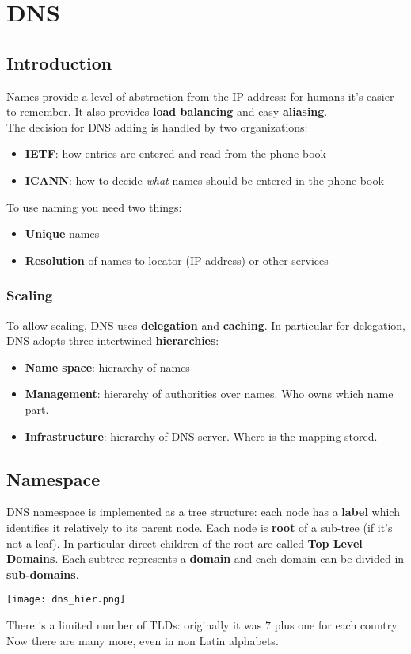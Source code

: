 \newpage
\section{DNS}
\subsection{Introduction}
Names provide a level of abstraction from the IP address: for humans it's easier to remember. It also provides \textbf{load balancing} and easy \textbf{aliasing}.\\
The decision for DNS adding is handled by two organizations:
\begin{itemize}
	\item \textbf{IETF}: how entries are entered and read from the phone book
	\item \textbf{ICANN}: how to decide \textit{what} names should be entered in the phone book
\end{itemize}
To use naming you need two things:
\begin{itemize}
	\item \textbf{Unique} names
	\item \textbf{Resolution} of names to locator (IP address) or other services
\end{itemize}

\subsubsection{Scaling}
To allow scaling, DNS uses \textbf{delegation} and \textbf{caching}. In particular for delegation, DNS adopts three intertwined \textbf{hierarchies}:
\begin{itemize}
	\item \textbf{Name space}: hierarchy of names
	\item \textbf{Management}: hierarchy of authorities over names. Who owns which name part.
	\item \textbf{Infrastructure}: hierarchy of DNS server. Where is the mapping stored.
\end{itemize}

\subsection{Namespace}
DNS namespace is implemented as a tree structure: each node has a \textbf{label} which identifies it relatively to its parent node. Each node is \textbf{root} of a sub-tree (if it's not a leaf). In particular direct children of the root are called \textbf{Top Level Domains}. Each subtree represents a \textbf{domain} and each domain can be divided in \textbf{sub-domains}.
\begin{center}
	\texttt{[image: dns\_hier.png]}
\end{center}
There is a limited number of TLDs: originally it was $7$ plus one for each country. Now there are many more, even in non Latin alphabets.
